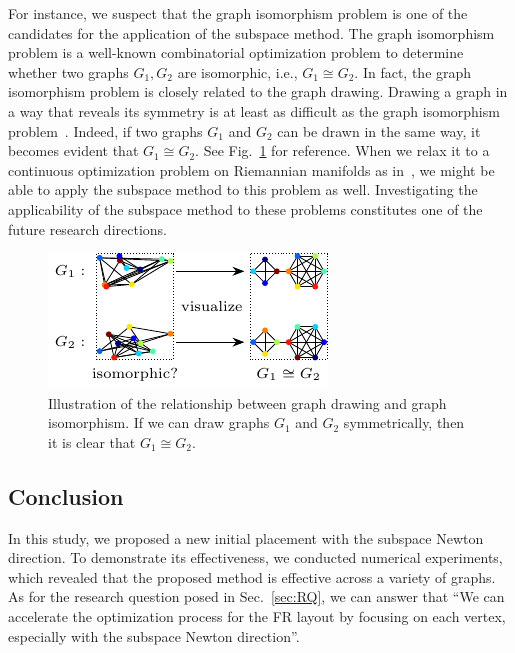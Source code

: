 \documentclass[dvipdfmx,10pt,journal,compsoc]{IEEEtran}
\begin{document}
For instance, we suspect that the graph isomorphism problem is one of the candidates for the application of the subspace method.
The graph isomorphism problem is a well-known combinatorial optimization problem to determine whether two graphs $G_1,G_2$ are isomorphic, i.e., $G_1 \cong G_2$.
In fact, the graph isomorphism problem is closely related to the graph drawing. Drawing a graph in a way that reveals its symmetry is at least as difficult as the graph isomorphism problem~\cite{eades1984heuristic}. Indeed, if two graphs $G_1$ and $G_2$ can be drawn in the same way, it becomes evident that $G_1 \cong G_2$. See Fig.~\ref{fig:iso} for reference.
When we relax it to a continuous optimization problem on Riemannian manifolds as in~\cite{klusContinuousOptimizationMethods2023, klusContinuousOptimizationMethods2023}, we might be able to apply the subspace method to this problem as well.
Investigating the applicability of the subspace method to these problems constitutes one of the future research directions.

\begin{figure}[t]
  \centering
  \includegraphics[width=\columnwidth]{iso/iso.pdf}
  \caption{
    Illustration of the relationship between graph drawing and graph isomorphism.
    If we can draw graphs $G_1$ and $G_2$ symmetrically, then it is clear that $G_1 \cong G_2$.
  }
  \label{fig:iso}
\end{figure}

\subsection{Conclusion} \label{sec:conclusion}

In this study, we proposed a new initial placement with the subspace Newton direction.
To demonstrate its effectiveness, we conducted numerical experiments, which revealed that the proposed method is effective across a variety of graphs. As for the research question posed in Sec.~\ref{sec:RQ}, we can answer that ``We can accelerate the optimization process for the FR layout by focusing on each vertex, especially with the subspace Newton direction''.
\end{document}
